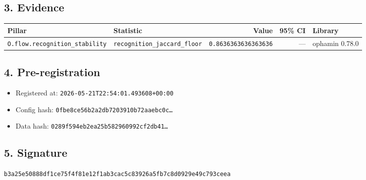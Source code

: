 \documentclass{article}
\begin{document}
\subsection*{3. Evidence}
\begin{tabular}{llrrl}\toprule
\textbf{Pillar} & \textbf{Statistic} & \textbf{Value} & \textbf{95\% CI} & \textbf{Library} \\\midrule
\texttt{O.flow.recognition\_stability} & \texttt{recognition\_jaccard\_floor} & \texttt{0.8636363636363636} & --- & ophamin 0.78.0 \\
\bottomrule\end{tabular}
\subsection*{4. Pre-registration}
\begin{itemize}
\item Registered at: \texttt{2026-05-21T22:54:01.493608+00:00}
\item Config hash: \texttt{0fbe8ce56b2a2db7203910b72aaebc0c\dots}
\item Data hash: \texttt{0289f594eb2ea25b582960992cf2db41\dots}
\end{itemize}
\subsection*{5. Signature}
\texttt{b3a25e50888df1ce75f4f81e12f1ab3cac5c83926a5fb7c8d0929e49c793ceea}\\
\end{document}
